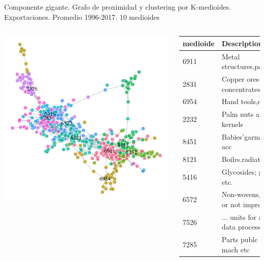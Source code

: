 \documentclass[compress]{beamer}
\begin{document}
\begin{frame}
	\small{Componente gigante. Grafo de proximidad y clustering por K-medioides. Exportaciones. Promedio 1996-2017. 10 medioides}
\begin{columns}[c] 

	
		\includegraphics[width=\linewidth]{pam10_gigant}


	\tiny
\begin{table}
	\centering
	\begin{tabular}{ll}
		\hline
		medioide & Description \\ 
		\hline
		6911 & Metal structures,parts \\ 
		2831 & Copper ores and concentrates \\ 
		6954 & Hand tools,etc. nes \\ 
		2232 & Palm nuts and kernels \\ 
		8451 & Babies'garmnts,clths acc \\ 
		8121 & Boilrs.radiatrs,etc.n.el \\ 
		5416 & Glycosides; glands etc. \\ 
		6572 & Non-wovens, whether or not impregnated \\ 
		7526 & ... units for automatic data processing \\ 
		7285 & Parts publc wrk mach etc \\ 
		\hline
	\end{tabular}
\end{table}
	
\end{columns}

\end{frame}
\end{document}
